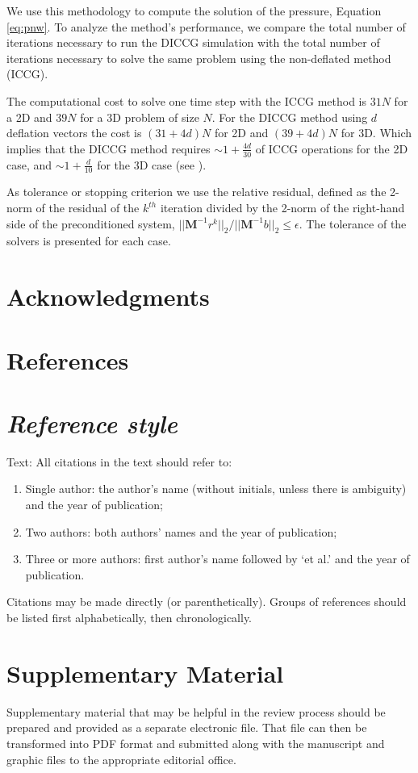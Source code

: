 \documentclass[times,final]{elsarticle}
\begin{document}
We use this methodology to compute the solution of the  pressure, Equation \eqref{eq:pnw}. To analyze the method's performance, we compare the total number of iterations necessary to run the DICCG simulation with the total number of iterations necessary to solve the same problem using the non-deflated method (ICCG). \par
The computational cost to solve one time step  with the ICCG method is $31 N$ for a 2D and $39N$ for a 3D problem of size $N$. For the DICCG method using $d$ deflation vectors the cost is $(31+4d)N$ for 2D and $(39+4d)N$ for 3D. Which implies that the DICCG method requires $\sim 1+ \frac{4d}{30}$ of ICCG operations for the 2D case, and $\sim 1+ \frac{d}{10}$ for the 3D case (see \cite{Diaz18_TU}). \par
As tolerance or stopping criterion we use the relative residual, defined as the 2-norm of the residual of the $k^{th}$ iteration divided by 
the 2-norm of the right-hand side of the preconditioned system, ${||\mathbf{M}^{-1}r^k||_2}\slash {||\mathbf{M}^{-1}b||_2}\leq \epsilon.$
The tolerance of the solvers is presented for each case.\par

\section*{Acknowledgments}

\section*{References}



\section*{\itshape Reference style}

Text: All citations in the text should refer to:
\begin{enumerate}
\item Single author: the author's name (without initials, unless there
is ambiguity) and the year of publication;
\item Two authors: both authors' names and the year of publication;
\item Three or more authors: first author's name followed by `et al.'
and the year of publication.
\end{enumerate}
Citations may be made directly (or parenthetically). Groups of
references should be listed first alphabetically, then chronologically.




\section*{Supplementary Material}

Supplementary material that may be helpful in the review process should
be prepared and provided as a separate electronic file. That file can
then be transformed into PDF format and submitted along with the
manuscript and graphic files to the appropriate editorial office.
\end{document}
